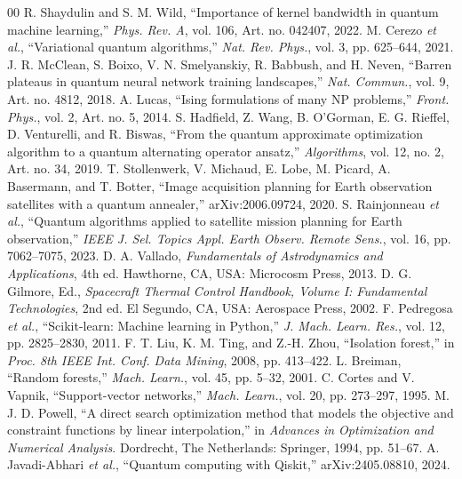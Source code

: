 \documentclass[conference]{IEEEtran}
\begin{document}
\begin{thebibliography}{00}
 R. Shaydulin and S. M. Wild, ``Importance of kernel bandwidth in
quantum machine learning,'' \textit{Phys. Rev. A}, vol. 106, Art. no. 042407, 2022.
 M. Cerezo \textit{et al.}, ``Variational quantum algorithms,''
\textit{Nat. Rev. Phys.}, vol. 3, pp. 625--644, 2021.
 J. R. McClean, S. Boixo, V. N. Smelyanskiy, R. Babbush, and H. Neven,
``Barren plateaus in quantum neural network training landscapes,'' \textit{Nat. Commun.},
vol. 9, Art. no. 4812, 2018.
 A. Lucas, ``Ising formulations of many NP problems,'' \textit{Front.
Phys.}, vol. 2, Art. no. 5, 2014.
 S. Hadfield, Z. Wang, B. O'Gorman, E. G. Rieffel, D. Venturelli, and
R. Biswas, ``From the quantum approximate optimization algorithm to a quantum alternating
operator ansatz,'' \textit{Algorithms}, vol. 12, no. 2, Art. no. 34, 2019.
 T. Stollenwerk, V. Michaud, E. Lobe, M. Picard, A. Basermann, and
T. Botter, ``Image acquisition planning for Earth observation satellites with a quantum
annealer,'' arXiv:2006.09724, 2020.
 S. Rainjonneau \textit{et al.}, ``Quantum algorithms applied to
satellite mission planning for Earth observation,'' \textit{IEEE J. Sel. Topics Appl. Earth
Observ. Remote Sens.}, vol. 16, pp. 7062--7075, 2023.
 D. A. Vallado, \textit{Fundamentals of Astrodynamics and Applications},
4th ed. Hawthorne, CA, USA: Microcosm Press, 2013.
 D. G. Gilmore, Ed., \textit{Spacecraft Thermal Control Handbook, Volume
I: Fundamental Technologies}, 2nd ed. El Segundo, CA, USA: Aerospace Press, 2002.
 F. Pedregosa \textit{et al.}, ``Scikit-learn: Machine learning in
Python,'' \textit{J. Mach. Learn. Res.}, vol. 12, pp. 2825--2830, 2011.
 F. T. Liu, K. M. Ting, and Z.-H. Zhou, ``Isolation forest,'' in
\textit{Proc. 8th IEEE Int. Conf. Data Mining}, 2008, pp. 413--422.
 L. Breiman, ``Random forests,'' \textit{Mach. Learn.}, vol. 45,
pp. 5--32, 2001.
 C. Cortes and V. Vapnik, ``Support-vector networks,'' \textit{Mach.
Learn.}, vol. 20, pp. 273--297, 1995.
 M. J. D. Powell, ``A direct search optimization method that models the
objective and constraint functions by linear interpolation,'' in \textit{Advances in
Optimization and Numerical Analysis}. Dordrecht, The Netherlands: Springer, 1994, pp. 51--67.
 A. Javadi-Abhari \textit{et al.}, ``Quantum computing with Qiskit,''
arXiv:2405.08810, 2024.
\end{thebibliography}
\end{document}
